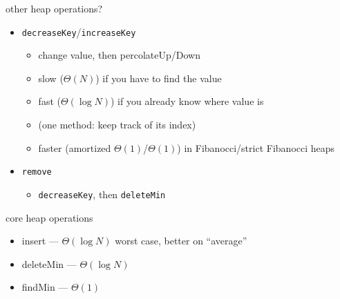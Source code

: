 \begin{frame}{other heap operations?}
\begin{itemize}
\item \texttt{decreaseKey}/\texttt{increaseKey}
    \begin{itemize}
    \item change value, then percolateUp/Down
    \item slow ($\Theta(N)$) if you have to find the value
    \item fast ($\Theta(\log N)$) if you already know where value is
    \item (one method: keep track of its index)
    \item faster (amortized $\Theta(1)$/$\Theta(1)$) in Fibanocci/strict Fibanocci heaps
    \end{itemize}
\item \texttt{remove}
    \begin{itemize}
    \item \texttt{decreaseKey}, then \texttt{deleteMin}
    \end{itemize}
\end{itemize}
\end{frame}

\begin{frame}{core heap operations}
\begin{itemize}
\item insert --- $\Theta(\log N)$ worst case, better on ``average''
\item deleteMin --- $\Theta(\log N)$
\item findMin --- $\Theta(1)$
\end{itemize}
\end{frame}
